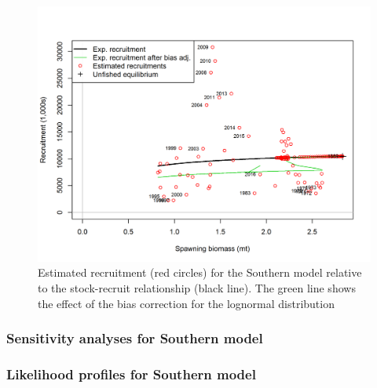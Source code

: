\documentclass[12pt,]{article}
\begin{document}
\FloatBarrier

\begin{figure}[htbp]
\centering
\includegraphics{r4ss/plots_mod2/SR_curve2.png}
\caption{Estimated recruitment (red circles) for the Southern model
relative to the stock-recruit relationship (black line). The green line
shows the effect of the bias correction for the lognormal distribution
\label{fig:stock_recruit_curve.S}}
\end{figure}

\FloatBarrier

\newpage

\subsubsection{Sensitivity analyses for Southern
model}\label{sensitivity-analyses-for-southern-model}

\FloatBarrier

\subsubsection{Likelihood profiles for Southern
model}\label{likelihood-profiles-for-southern-model}
\end{document}
